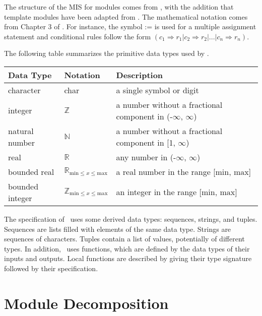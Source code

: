 \documentclass[12pt, titlepage]{article}
\begin{document}

The structure of the MIS for modules comes from \citet{HoffmanAndStrooper1995},
with the addition that template modules have been adapted from
\cite{GhezziEtAl2003}.  The mathematical notation comes from Chapter 3 of
\citet{HoffmanAndStrooper1995}.  For instance, the symbol := is used for a
multiple assignment statement and conditional rules follow the form $(c_1
\Rightarrow r_1 | c_2 \Rightarrow r_2 | ... | c_n \Rightarrow r_n )$.

The following table summarizes the primitive data types used by \progname. 

\begin{center}
\renewcommand{\arraystretch}{1.2}
\noindent 
\begin{tabular}{l l p{7.5cm}} 
\toprule 
\textbf{Data Type} & \textbf{Notation} & \textbf{Description}\\ 
\midrule
character & char & a single symbol or digit\\
integer & $\mathbb{Z}$ & a number without a fractional component in (-$\infty$, $\infty$) \\
natural number & $\mathbb{N}$ & a number without a fractional component in [1, $\infty$) \\
real & $\mathbb{R}$ & any number in (-$\infty$, $\infty$)\\
bounded real & $\mathbb{R}_{\text{min} \leq x \leq \text{max}}$ & a real number in the range [$\text{min}$, $\text{max}$]\\
bounded integer & $\mathbb{Z}_{\text{min} \leq x \leq \text{max}}$ & an integer in the range [$\text{min}$, $\text{max}$]\\
\bottomrule
\end{tabular} 
\end{center}

\noindent
The specification of \progname \ uses some derived data types: sequences, strings, and
tuples. Sequences are lists filled with elements of the same data type. Strings
are sequences of characters. Tuples contain a list of values, potentially of
different types. In addition, \progname \ uses functions, which
are defined by the data types of their inputs and outputs. Local functions are
described by giving their type signature followed by their specification.

\section{Module Decomposition}
\end{document}
